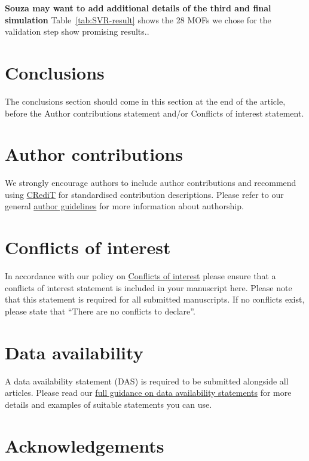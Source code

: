 \documentclass[twoside,twocolumn,9pt]{article}
\begin{document}
\textbf{\textcolor{myred}{Souza may want to add additional details of the third and final simulation}
}
Table~\ref{tab:SVR-result} shows the 28 MOFs we chose for the validation step show promising results..


\section{Conclusions}
The conclusions section should come in this section at the end of the article, before the Author contributions statement and/or Conflicts of interest statement.

\section*{Author contributions}
We strongly encourage authors to include author contributions and recommend using \href{https://casrai.org/credit/}{CRediT} for standardised contribution descriptions. Please refer to our general \href{https://www.rsc.org/journals-books-databases/journal-authors-reviewers/author-responsibilities/}{author guidelines} for more information about authorship.

\section*{Conflicts of interest}
In accordance with our policy on \href{https://www.rsc.org/journals-books-databases/journal-authors-reviewers/author-responsibilities/#code-of-conduct}{Conflicts of interest} please ensure that a conflicts of interest statement is included in your manuscript here.  Please note that this statement is required for all submitted manuscripts.  If no conflicts exist, please state that ``There are no conflicts to declare''.

\section*{Data availability}


A data availability statement (DAS) is required to be submitted alongside all articles. Please read our \href{https://www.rsc.org/journals-books-databases/author-and-reviewer-hub/authors-information/prepare-and-format/data-sharing/#dataavailabilitystatements}{full guidance on data availability statements} for more details and examples of suitable statements you can use.

\section*{Acknowledgements}
\end{document}
